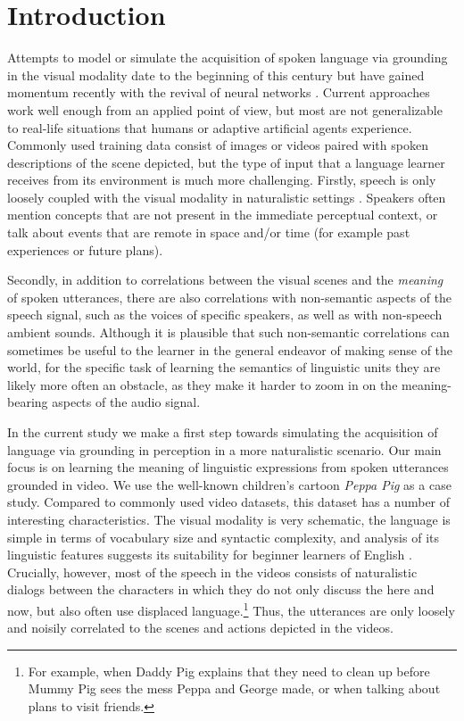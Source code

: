 \section{Introduction}
\label{sec:intro}

Attempts to model or simulate the acquisition of spoken language via
grounding in the visual modality date to the beginning of this century
\citep{roypentland2002learning} but have gained momentum recently
with the revival of neural networks
\citep[e.g.][]{synnaeve2014learning,harwath2015deep,
  harwath2016unsupervised,chrupala-etal-2017-representations,alishahi-etal-2017-encoding,harwath2018jointly,Merkx2019,havard2019models,rouditchenko2020avlnet,khorrami_2021,peng2021fastslow}.
Current approaches work well enough from an applied point of view, 
but most are not generalizable to real-life situations that humans or 
adaptive artificial agents experience. Commonly used training data
consist of images or videos paired with spoken descriptions
of the scene depicted, but the type of input that a language learner receives 
from its environment is much more challenging.  
Firstly, speech is only loosely coupled with the visual modality in naturalistic settings
 \citep{matusevych2013automatic, beekhuizen2013word}. Speakers often mention 
 concepts that are not present in the immediate perceptual context, 
 or talk about events that are remote in space and/or time (for
 example past experiences or future plans).
 
Secondly, in addition to
correlations between the visual scenes and the {\it meaning} of spoken
utterances, there are also correlations with non-semantic aspects of
the speech signal, such as the voices of specific speakers, as well
as with non-speech ambient sounds. Although it is plausible that such
non-semantic correlations can sometimes be useful to the learner in
the general endeavor of making sense of the world, for the specific
task of learning the semantics of linguistic units they are likely more
often an obstacle, as they make it harder to zoom in on the
meaning-bearing aspects of the audio signal.

In the current study we make a first step towards simulating the
acquisition of language via grounding in perception in a more
naturalistic scenario.  Our main focus is on learning the meaning of
linguistic expressions from spoken utterances grounded in video.  We
use the well-known children's cartoon {\it Peppa Pig} as a case
study. Compared to commonly used video datasets, this dataset has a
number of interesting characteristics.  The visual modality is very
schematic, the language is simple in terms of vocabulary size and
syntactic complexity, and analysis of its linguistic features suggests
its suitability for beginner learners of English
\cite{kokla2021peppa,scheffler2021peppa}.  Crucially, however, most of
the speech in the videos consists of naturalistic dialogs between the
characters in which they do not only discuss the here and now, but
also often use displaced language.\footnote{For example, when Daddy
  Pig explains that they need to clean up before Mummy Pig sees the mess
  Peppa and George made, or when talking about plans to visit
  friends.}  Thus, the utterances are only loosely and noisily
correlated to the scenes and actions depicted in the videos.

